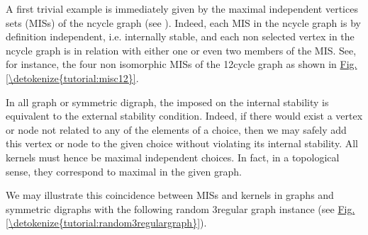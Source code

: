 \documentclass[a4paper,12pt,english]{sphinxhowto}
\begin{document}
A first trivial example is immediately given by the maximal independent vertices sets (MISs) of the n\sphinxhyphen{}cycle graph (see {\hyperref[\detokenize{tutorial:isomorphicmis-tutorial-label}]{}}). Indeed, each MIS in the n\sphinxhyphen{}cycle graph is by definition independent, i.e. internally stable, and each non selected vertex in the n\sphinxhyphen{}cycle graph is in relation with either one or even two members of the MIS. See, for instance, the four non isomorphic MISs of the 12\sphinxhyphen{}cycle graph as shown in \hyperref[\detokenize{tutorial:misc12}]{Fig.\@ \ref{\detokenize{tutorial:misc12}}}.

In all graph or symmetric digraph, the  imposed on the internal stability is equivalent to the external stability condition. Indeed, if there would exist a vertex or node not related to any of the elements of a choice, then we may safely add this vertex or node to the given choice without violating its internal stability. All kernels must hence be maximal independent choices. In fact, in a topological sense, they correspond to maximal  in the given graph.

We may illustrate this coincidence between MISs and kernels in graphs
and symmetric digraphs with the following random 3\sphinxhyphen{}regular graph
instance (see \hyperref[\detokenize{tutorial:random3regulargraph}]{Fig.\@ \ref{\detokenize{tutorial:random3regulargraph}}}).

\begin{sphinxVerbatim}[commandchars=\\\{\},numbers=left,firstnumber=1,stepnumber=1]
   
  
\end{sphinxVerbatim}
\end{document}
